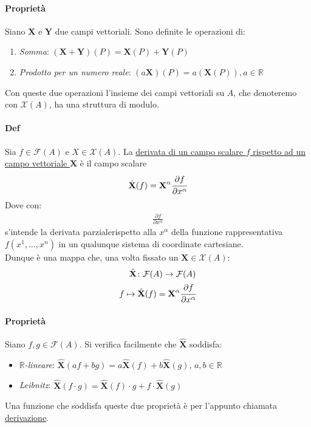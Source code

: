     \paragraph*{Proprietà} Siano $\mathbf{X}$ e $\mathbf{Y}$ due campi vettoriali. Sono definite le operazioni di:
    \begin{enumerate}
        \item \textit{Somma}: $(\mathbf{X}+\mathbf{Y})(P)=\mathbf{X}(P)+\mathbf{Y}(P)$
        \item \textit{Prodotto per un numero reale}: $(a\mathbf{X})(P)=a(\mathbf{X}(P)), a \in \mathbb{R}$
    \end{enumerate}
    Con queste due operazioni l'insieme dei campi vettoriali su $A$, che denoteremo con $\mathcal{X}(A)$, ha una struttura di modulo.
    \paragraph{Def} Sia $f\in \mathcal{F}(A)$ e $X\in \mathcal{X}(A)$. La \underline{derivata di un campo scalare $f$ rispetto ad un campo vettoriale $\textbf{X}$} è il campo scalare 
    \begin{align*}
        \hat{\textbf{X}} (f)=\textbf{X}^\alpha\cfrac{\partial f}{\partial x^\alpha}
    \end{align*}
    Dove con: 
    \begin{align*}
            \frac{\partial f}{\partial x^\alpha}
    \end{align*}
    s'intende la derivata parzialerispetto alla $x^\alpha$ della funzione rappresentativa $f(x^1,\dots,x^n)$ in un qualunque sistema di coordinate cartesiane.\\
    Dunque è una mappa che, una volta fissato un $\mathbf{X}\in \mathcal{X}(A)$:
    \begin{align*}
        \hat{\textbf{X}} \colon \mathcal{F}(A)\to \mathcal{F}(A)\\
        f\mapsto \hat{\textbf{X}} (f)=\textbf{X}^\alpha\cfrac{\partial f}{\partial x^\alpha}
    \end{align*}
    \paragraph{Proprietà} Siano $f,g\in \mathcal{F}(A)$. Si verifica facilmente che $\hat{\textbf{X}}$ soddisfa:
    \begin{itemize}
        \item \textit{$\mathbb{R}$-lineare}: $\hat{\textbf{X}}(af+bg)=a\hat{\textbf{X}}(f)+b\hat{\textbf{X}}(g)$, $a,b\in \mathbb{R}$
        \item \textit{Leibnitz}: $\hat{\textbf{X}}(f\cdot g)=\hat{\textbf{X}}(f)\cdot g+f\cdot \hat{\textbf{X}}(g)$
    \end{itemize} Una funzione che soddisfa queste due proprietà è per l'appunto chiamata \underline{derivazione}.
